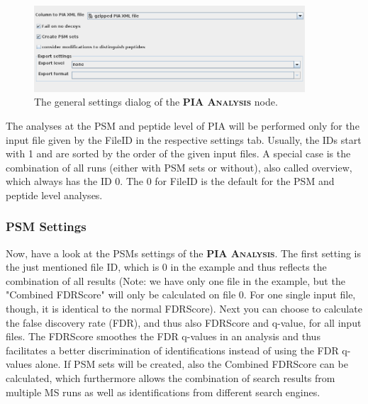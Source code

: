 \documentclass[a4paper,11pt,twoside]{article}
\newcommand{\knimenode}[1]{{\scshape\bfseries #1}}
\begin{document}
\begin{figure}[ht!]
	\centering
	\includegraphics[width=0.9\textwidth]{graphics/pia_settings_general}
	\caption{The general settings dialog of the \knimenode{PIA Analysis} node.}
	\label{pia_settings_general}
\end{figure}


The analyses at the PSM and peptide level of PIA will be performed only for the
input file given by the FileID in the respective settings tab. Usually, the IDs
start with 1 and are sorted by the order of the given input files. A special
case is the combination of all runs (either with PSM sets or without), also
called overview, which always has the ID 0. The 0 for FileID is the default for
the PSM and peptide level analyses.


\subsubsection{PSM Settings}

Now, have a look at the PSMs settings of the \knimenode{PIA Analysis}. The
first setting is the just mentioned file ID, which is 0 in the example and thus
reflects the combination of all results (Note: we have only one file in the
example, but the "Combined FDRScore" will only be calculated on file 0. For one
single input file, though, it is identical to the normal FDRScore). Next you
can choose to calculate the false discovery rate (FDR), and thus also FDRScore
and q-value, for all input files. The FDRScore \cite{jones2009} smoothes the
FDR q-values in an analysis and thus facilitates a better discrimination of
identifications instead of using the FDR q-values alone. If PSM sets will be
created, also the Combined FDRScore can be calculated, which furthermore allows
the combination of search results from multiple MS runs as well as
identifications from different search engines.
\end{document}

